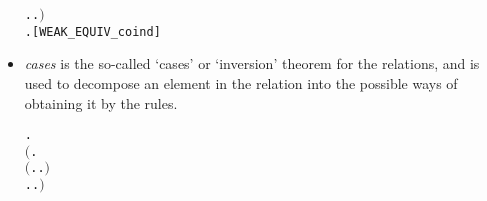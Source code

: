 \begin{itemize}
\begin{alltt}
            \HOLSymConst{\HOLTokenForall{}}.  \HOLTokenTransBegin\HOLSymConst{\ensuremath{\tau}}\HOLTokenTransEnd {} \HOLSymConst{\HOLTokenImp{}} \HOLSymConst{\HOLTokenExists{}}.  \HOLSymConst{\HOLTokenEPS}  \HOLSymConst{\HOLTokenConj{}}   \ensuremath{)} \HOLSymConst{\HOLTokenImp{}}
       \HOLSymConst{\HOLTokenForall{}} .    \HOLSymConst{\HOLTokenImp{}}  \HOLSymConst{\HOLTokenWeakEQ} \hfill{[WEAK_EQUIV_coind]}
\end{alltt}
\item \emph{cases} is the so-called `cases' or `inversion' theorem for
  the relations, and is used to decompose an element in the relation into the possible ways of
  obtaining it by the rules.
\begin{alltt}
\HOLTokenTurnstile{} \HOLSymConst{\HOLTokenForall{}} .
        \HOLSymConst{\HOLTokenWeakEQ}  \HOLSymConst{\HOLTokenEquiv{}}
       \ensuremath{(}\HOLSymConst{\HOLTokenForall{}}.
            \ensuremath{(}\HOLSymConst{\HOLTokenForall{}}.  \HOLTokenTransBegin{} \HOLTokenTransEnd {} \HOLSymConst{\HOLTokenImp{}} \HOLSymConst{\HOLTokenExists{}}.  \HOLTokenWeakTransBegin{} \HOLTokenWeakTransEnd {} \HOLSymConst{\HOLTokenConj{}}  \HOLSymConst{\HOLTokenWeakEQ} \ensuremath{)} \HOLSymConst{\HOLTokenConj{}}
            \HOLSymConst{\HOLTokenForall{}}.  \HOLTokenTransBegin{} \HOLTokenTransEnd {} \HOLSymConst{\HOLTokenImp{}} \HOLSymConst{\HOLTokenExists{}}.  \HOLTokenWeakTransBegin{} \HOLTokenWeakTransEnd {} \HOLSymConst{\HOLTokenConj{}}  \HOLSymConst{\HOLTokenWeakEQ} \ensuremath{)} \HOLSymConst{\HOLTokenConj{}}

\end{alltt}
\end{itemize}
